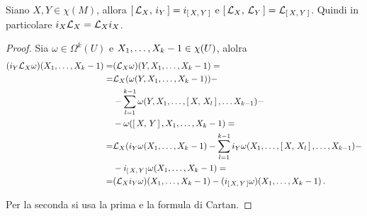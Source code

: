 \begin{corollary}
	Siano $X,Y\in\chi(M)$, allora $\comm{\Lie_X}{i_Y} = i_{\comm XY}$ e $\comm{\Lie_X}{\Lie_Y} = \Lie_{\comm XY}$.
	Quindi in particolare $i_X\Lie_X = \Lie_X i_X$.
\end{corollary}
\begin{proof}
	Sia $\omega \in \Omega^k(U)$ e $\seqb X{k-1}, \in \chi(U)$, alolra
	\begin{align*}
		(i_Y\Lie_X\omega)(\seqb X{k-1},) =& (\Lie_X\omega)(Y,\seqb X{k-1},) =\\
		=&\Lie_X(\omega(Y,\seqb X{k-1},)) -\\
		&-\sum_{l=1}^{k-1}\omega(Y,X_1,\ldots,\comm{X}{X_l},\ldots X_{k-1}) -\\
		&-\omega (\comm XY, \seqb X{k-1},)=\\
		=& \Lie_X(i_Y\omega(\seqb X{k-1},) -\sum_{l=1}^{k-1} i_Y\omega(X_1,\ldots, \comm X{X_l}, \ldots, X_{k-1}) -\\
		&-i_{\comm XY} \omega (\seqb X{k-1},) =\\
		=& (\Lie_X i_Y\omega)(\seqb X{k-1},) - (i_{\comm XY}\omega)(\seqb X{k-1},) \punto
	\end{align*}

	Per la seconda si usa la prima e la formula di Cartan.
\end{proof}




































